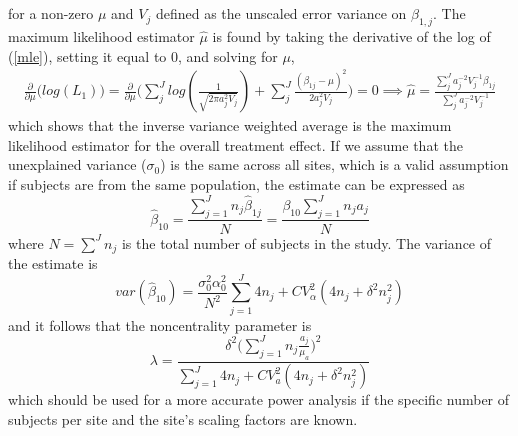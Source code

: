 \documentclass{article}
\begin{document}
for a non-zero $\mu$ and $V_j$ defined as the unscaled error variance on $\hat{\beta_{1,j}}$. The maximum likelihood estimator $\hat{\mu}$ is found by taking the derivative of the log of (\ref{mle}), setting it equal to 0, and solving for $\mu$,
\begin{multline}
\frac{\partial}{\partial \mu}\Big(log(L_1)\Big) =
\frac{\partial}{\partial \mu} \Big(\sum\limits_j^J log(\frac{1}{\sqrt{2 \pi a_j^2 V_j}}) + \sum\limits_j^J \frac{(\beta_{1j} - \mu)^2}{2 a_j^2V_j}\Big) = 0
\implies \hat{\mu} = \frac{\sum\limits_j^J a_j^{-2}V_j^{-1}\beta_{1j}}{\sum\limits_j^J a_j^{-2}V_j^{-1}}
\end{multline}
which shows that the inverse variance weighted average is the maximum likelihood estimator for the overall treatment effect. If we assume that the unexplained variance ($\sigma_0$) is the same across all sites, which is a valid assumption if subjects are from the same population, the estimate can be expressed as
\begin{equation}
\hat{\beta}_{10} = \frac{\sum\limits_{j=1}^J n_j\hat{\beta}_{1j}}{N} = \frac{\beta_{10}\sum\limits_{j=1}^J n_j a_j}{N} 
\end{equation}
where $N = \sum\limits^J n_j$ is the total number of subjects in the study. The variance of the estimate is
\begin{equation}
var(\hat{\beta}_{10}) = \frac{\sigma_0^2 \alpha_0^2}{N^2}\sum\limits_{j=1}^J 4n_j + CV_{\alpha}^2(4n_j + \delta^2n_j^2) 
\end{equation}
and it follows that the noncentrality parameter is
\begin{equation}
\label{weightedlambda}
\lambda = \frac{\delta^2 \Big(\sum\limits_{j=1}^J n_j \frac{a_j}{\mu_a}\Big)^2 }{\sum\limits_{j=1}^J 4n_j + CV_{a}^2(4n_j + \delta^2n_j^2)}
\end{equation}
which should be used for a more accurate power analysis if the specific number of subjects per site and the site's scaling factors are known.

{}
\end{document}
